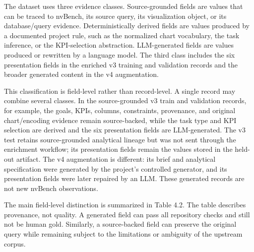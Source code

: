 The dataset uses three evidence classes. Source-grounded fields are values that can be traced to nvBench, its source query, its visualization object, or its database/query evidence. Deterministically derived fields are values produced by a documented project rule, such as the normalized chart vocabulary, the task inference, or the KPI-selection abstraction. LLM-generated fields are values produced or rewritten by a language model. The third class includes the six presentation fields in the enriched v3 training and validation records and the broader generated content in the v4 augmentation.

This classification is field-level rather than record-level. A single record may combine several classes. In the source-grounded v3 train and validation records, for example, the goals, KPIs, columns, constraints, provenance, and original chart/encoding evidence remain source-backed, while the task type and KPI selection are derived and the six presentation fields are LLM-generated. The v3 test retains source-grounded analytical lineage but was not sent through the enrichment workflow; its presentation fields remain the values stored in the held-out artifact. The v4 augmentation is different: its brief and analytical specification were generated by the project's controlled generator, and its presentation fields were later repaired by an LLM. These generated records are not new nvBench observations.

The main field-level distinction is summarized in Table 4.2. The table describes provenance, not quality. A generated field can pass all repository checks and still not be human gold. Similarly, a source-backed field can preserve the original query while remaining subject to the limitations or ambiguity of the upstream corpus.

